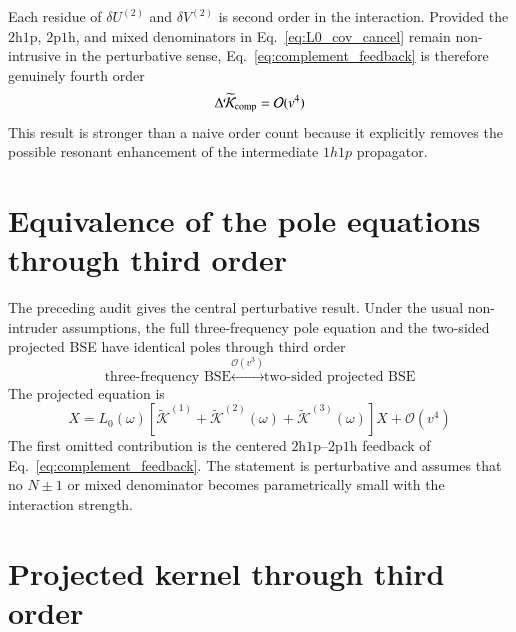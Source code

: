 \documentclass[aip,jcp,reprint,noshowkeys,superscriptaddress]{revtex4-1}
\newcommand{\hhp}{\text{2h1p}}
\newcommand{\pph}{\text{2p1h}}
\begin{document}
Each residue of $\delta U^{(2)}$ and $\delta V^{(2)}$ is second order in the interaction.
Provided the $\hhp$, $\pph$, and mixed denominators in Eq.~\eqref{eq:L0_cov_cancel} remain non-intrusive in the perturbative sense, Eq.~\eqref{eq:complement_feedback} is therefore genuinely fourth order
\begin{equation}
	\Delta\widetilde{\mathcal K}_{\rm comp}
	=
	\mathcal O(v^4)
	\label{eq:feedback_order}
\end{equation}
This result is stronger than a naive order count because it explicitly removes the possible resonant enhancement of the intermediate $1h1p$ propagator.

\section[Pole-equation equivalence]{Equivalence of the pole equations through third order}
\label{sec:equivalence}

The preceding audit gives the central perturbative result.
Under the usual non-intruder assumptions, the full three-frequency pole equation and the two-sided projected BSE have identical poles through third order
\begin{equation}
	\text{three-frequency BSE}
	\overset{\mathcal O(v^3)}{\longleftrightarrow}
	\text{two-sided projected BSE}
	\label{eq:equivalence_statement}
\end{equation}
The projected equation is
\begin{equation}
	X
	=
	L_0(\omega)
	\left[
	\widetilde{\mathcal K}^{(1)}
	+
	\widetilde{\mathcal K}^{(2)}(\omega)
	+
	\widetilde{\mathcal K}^{(3)}(\omega)
	\right]
	X
	+
	\mathcal O(v^4)
	\label{eq:projected_pole_equation}
\end{equation}
The first omitted contribution is the centered $\hhp$--$\pph$ feedback of Eq.~\eqref{eq:complement_feedback}.
The statement is perturbative and assumes that no $N\pm1$ or mixed denominator becomes parametrically small with the interaction strength.

\section{Projected kernel through third order}
\label{sec:projected_third}
\end{document}
